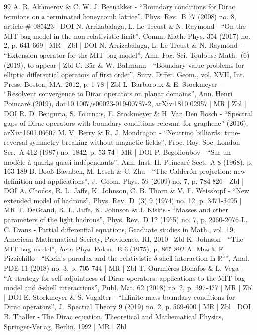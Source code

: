\begin{thebibliography}{99}
A. R. Akhmerov \& C. W. J. Beenakker - “Boundary conditions for Dirac fermions on a terminated honeycomb lattice”, Phys. Rev. B 77 (2008) no. 8, article \# 085423 | DOI
N. Arrizabalaga, L. Le Treust \& N. Raymond - “On the MIT bag model in the non-relativistic limit”, Comm. Math. Phys. 354 (2017) no. 2, p. 641-669 | MR | Zbl | DOI
N. Arrizabalaga, L. Le Treust \& N. Raymond - “Extension operator for the MIT bag model”, Ann. Fac. Sci. Toulouse Math. (6) (2019), to appear | Zbl
C. Bär \& W. Ballmann - “Boundary value problems for elliptic differential operators of first order”, Surv. Differ. Geom., vol. XVII, Int. Press, Boston, MA, 2012, p. 1-78 | Zbl
L. Barbaroux \& E. Stockmeyer - “Resolvent convergence to Dirac operators on planar domains”, Ann. Henri Poincaré (2019), doi:10.1007/s00023-019-00787-2, arXiv:1810.02957 | MR | Zbl | DOI
R. D. Benguria, S. Fournais, E. Stockmeyer \& H. Van Den Bosch - “Spectral gaps of Dirac operators with boundary conditions relevant for graphene” (2016), arXiv:1601.06607
M. V. Berry \& R. J. Mondragon - “Neutrino billiards: time-reversal symmetry-breaking without magnetic fields”, Proc. Roy. Soc. London Ser. A 412 (1987) no. 1842, p. 53-74 | MR | DOI
P. Bogolioubov - “Sur un modèle à quarks quasi-indépendants”, Ann. Inst. H. Poincaré Sect. A 8 (1968), p. 163-189
B. Booß-Bavnbek, M. Lesch \& C. Zhu - “The Calderón projection: new definition and applications”, J. Geom. Phys. 59 (2009) no. 7, p. 784-826 | Zbl | DOI
A. Chodos, R. L. Jaffe, K. Johnson, C. B. Thorn \& V. F. Weisskopf - “New extended model of hadrons”, Phys. Rev. D (3) 9 (1974) no. 12, p. 3471-3495 | MR
T. DeGrand, R. L. Jaffe, K. Johnson \& J. Kiskis - “Masses and other parameters of the light hadrons”, Phys. Rev. D 12 (1975) no. 7, p. 2060-2076
L. C. Evans - Partial differential equations, Graduate studies in Math., vol. 19, American Mathematical Society, Providence, RI, 2010 | Zbl
K. Johnson - “The MIT bag model”, Acta Phys. Polon. B 6 (1975), p. 865-892
A. Mas \& F. Pizzichillo - “Klein’s paradox and the relativistic $\delta $-shell interaction in $\mathbb{R}^3$”, Anal. PDE 11 (2018) no. 3, p. 705-744 | MR | Zbl
T. Ourmières-Bonafos \& L. Vega - “A strategy for self-adjointness of Dirac operators: applications to the MIT bag model and $\delta $-shell interactions”, Publ. Mat. 62 (2018) no. 2, p. 397-437 | MR | Zbl | DOI
E. Stockmeyer \& S. Vugalter - “Infinite mass boundary conditions for Dirac operators”, J. Spectral Theory 9 (2019) no. 2, p. 569-600 | MR | Zbl | DOI
B. Thaller - The Dirac equation, Theoretical and Mathematical Physics, Springer-Verlag, Berlin, 1992 | MR | Zbl
\end{thebibliography}
